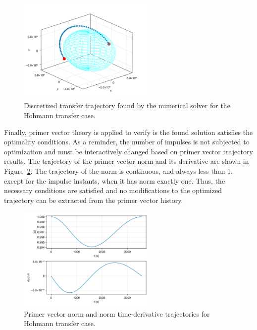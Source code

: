 \begin{figure}[htbp]
    \centering
    \includegraphics[width=0.6\textwidth]{img/hohmann_solved.png}
    \caption{Discretized transfer trajectory found by the numerical solver for the Hohmann transfer case.}
    \label{fig:hohmann_traj}
\end{figure}

Finally, primer vector theory is applied to verify is the found solution satisfies the optimality conditions. As a reminder, the number of impulses is not subjected to optimization and must be interactively changed based on primer vector trajectory results. The trajectory of the primer vector norm and its derivative are shown in Figure~\ref{fig:hohmann_primer_vec}. The trajectory of the norm is continuous, and always less than 1, except for the impulse instants, when it has norm exactly one. Thus, the necessary conditions are satisfied and no modifications to the optimized trajectory can be extracted from the primer vector history.

\begin{figure}[htbp]
    \centering
    \includegraphics[width=0.6\textwidth]{img/hohmann_primer_vector_history.png}
    \caption{Primer vector norm and norm time-derivative trajectories for Hohmann transfer case.}
    \label{fig:hohmann_primer_vec}
\end{figure}

